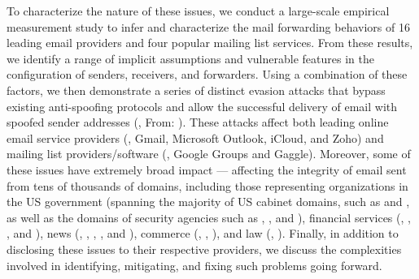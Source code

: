 To characterize the nature of these issues, we conduct a large-scale empirical
measurement study to infer and characterize the mail forwarding
behaviors of 16 leading email providers and four popular mailing
list services.  From these results, we identify a range of implicit
assumptions and vulnerable features in the
configuration of senders, receivers, and forwarders.  Using a
combination of these factors, we then demonstrate a series of distinct
evasion attacks that bypass existing anti-spoofing protocols and allow
the successful delivery of email with spoofed sender addresses (\eg,
From: ).  These attacks affect both leading
online email service providers (\eg, Gmail, Microsoft Outlook, iCloud, and
Zoho) and mailing list providers/software (\eg, Google Groups and
Gaggle).  Moreover, some of these issues have extremely broad
impact --- affecting the integrity of email sent from tens of
thousands of domains, including those representing organizations in the
US government (spanning the majority of US cabinet domains, such as
 and , as well as the domains of security agencies
such as , , and ), financial services
(\eg, , , and ), news (\eg,
,
,
, and ), commerce (\eg, , ), and law (\eg,
).
Finally, in addition to disclosing these issues to their respective
providers, we discuss the complexities involved in identifying,
mitigating, and fixing such problems going forward.


